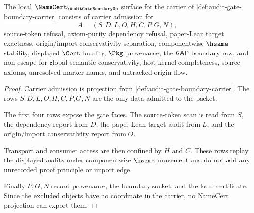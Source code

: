 \begin{theorem}
\label{thm:audit-gate-boundary-namecert-obligations}
The local $\NameCert_{\AuditGateBoundaryUp}$ surface for the carrier of \autoref{def:audit-gate-boundary-carrier} consists of carrier admission for
$$
A=(S,D,L,O,H,C,P,G,N),
$$
source-token refusal, axiom-purity dependency refusal, paper-Lean target exactness, origin/import conservativity separation, componentwise $\hsame$ stability, displayed $\Cont$ locality, $\Pkg$ provenance, the $\mathsf{GAP}$ boundary row, and non-escape for global semantic conservativity, host-kernel completeness, source axioms, unresolved marker names, and untracked origin flow.
\end{theorem}
\begin{proof}
Carrier admission is projection from \autoref{def:audit-gate-boundary-carrier}. The rows $S,D,L,O,H,C,P,G,N$ are the only data admitted to the packet.

The first four rows expose the gate faces. The source-token scan is read from $S$, the dependency report from $D$, the paper-Lean target audit from $L$, and the origin/import conservativity report from $O$.

Transport and consumer access are then confined by $H$ and $C$. These rows replay the displayed audits under componentwise $\hsame$ movement and do not add any unrecorded proof principle or import edge.

Finally $P,G,N$ record provenance, the boundary socket, and the local certificate. Since the excluded objects have no coordinate in the carrier, no NameCert projection can export them.
\end{proof}

